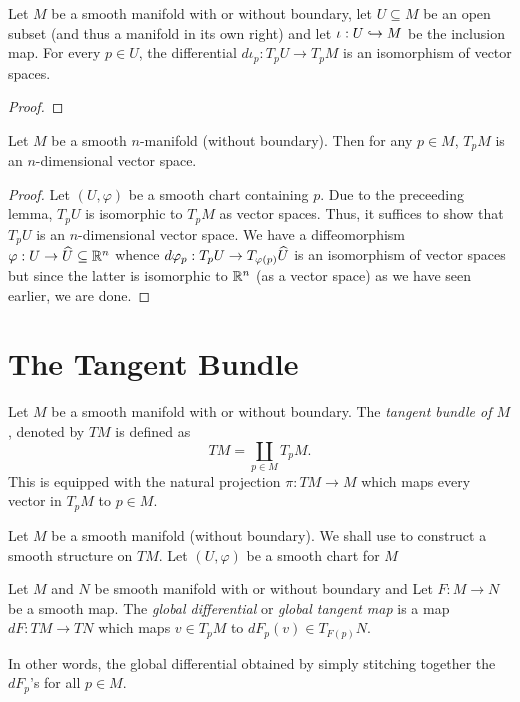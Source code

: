 \begin{lemma}
    Let $M$ be a smooth manifold with or without boundary, let $U\subseteq M$ be an open subset (and thus a manifold in its own right) and let $\iota: U\hookrightarrow M$ be the inclusion map. For every $p\in U$, the differential $d\iota_p: T_pU\to T_pM$ is an isomorphism of vector spaces.
\end{lemma}
\begin{proof}
    
\end{proof}

\begin{proposition}
    Let $M$ be a smooth $n$-manifold (without boundary). Then for any $p\in M$, $T_pM$ is an $n$-dimensional vector space.
\end{proposition}
\begin{proof}
    Let $(U,\varphi)$ be a smooth chart containing $p$. Due to the preceeding lemma, $T_pU$ is isomorphic to $T_pM$ as vector spaces. Thus, it suffices to show that $T_pU$ is an $n$-dimensional vector space. We have a diffeomorphism $\varphi: U\to\widehat{U}\subseteq\mathbb{R}^n$ whence $d\varphi_p: T_pU\to T_{\varphi(p)}\widehat{U}$ is an isomorphism of vector spaces but since the latter is isomorphic to $\mathbb{R}^n$ (as a vector space) as we have seen earlier, we are done.
\end{proof}

\section{The Tangent Bundle}

\begin{definition}
    Let $M$ be a smooth manifold with or without boundary. The \emph{tangent bundle of $M$}, denoted by $TM$ is defined as 
    \begin{equation*}
        TM = \coprod_{p\in M} T_pM.
    \end{equation*}
    This is equipped with the natural projection $\pi: TM\to M$ which maps every vector in $T_pM$ to $p\in M$.
\end{definition}

\begin{mdframed}[frametitle={\centering Topology on $TM$ for a manifold.}, frametitlerule=true, frametitlealignment=\centering]
    Let $M$ be a smooth manifold (without boundary). We shall use  to construct a smooth structure on $TM$. Let $(U,\varphi)$ be a smooth chart for $M$
\end{mdframed}

\begin{definition}
    Let $M$ and $N$ be smooth manifold with or without boundary and Let $F: M\to N$ be a smooth map. The \emph{global differential} or \emph{global tangent map} is a map $dF: TM\to TN$ which maps $v\in T_pM$ to $dF_p(v)\in T_{F(p)}N$.
\end{definition}

In other words, the global differential obtained by simply stitching together the $dF_p$'s for all $p\in M$.